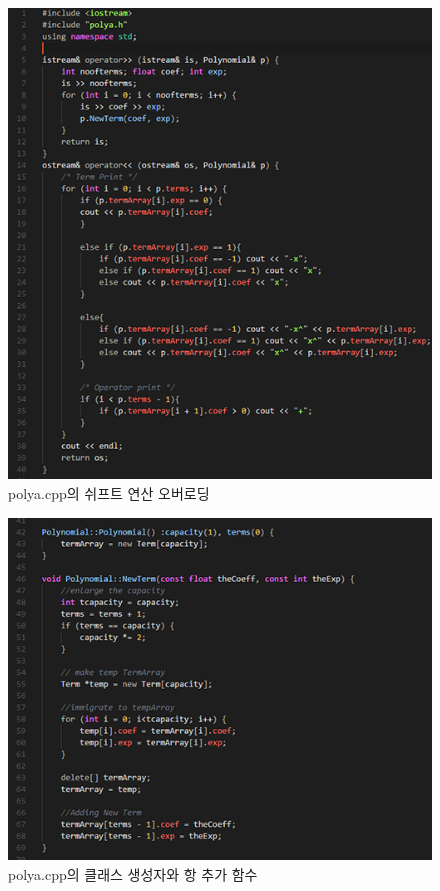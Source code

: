 \documentclass[a4paper,12pt]{article}
\begin{document}
\begin{figure}[t]\vspace*{4pt} 
\centerline{\includegraphics[width=1.0\columnwidth]{polya1}} 
\caption{polya.cpp의 쉬프트 연산 오버로딩}\vspace*{-6pt} 
\label{figure:polya1} 
\end{figure} 

\begin{figure}[t]\vspace*{4pt} 
\centerline{\includegraphics[width=1.0\columnwidth]{polya2}} 
\caption{polya.cpp의 클래스 생성자와 항 추가 함수}\vspace*{-6pt} 
\label{figure:polya2} 
\end{figure} 
\end{document}
